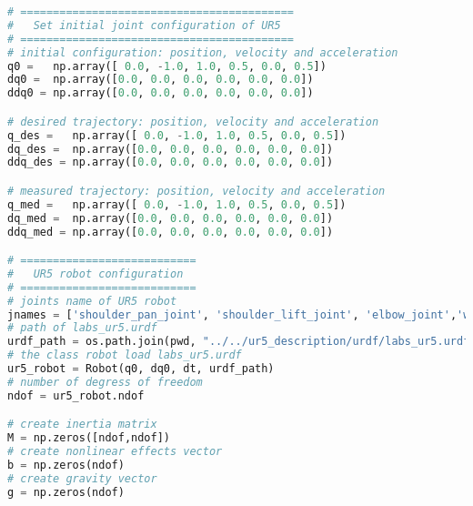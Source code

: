 \begin{lstlisting}[language=Python, caption={Move the ur5 robot end-effector using pose inverse dynamics \eqref{eq:pose_idyn} to achieve position $\mathbf{p_0}=\begin{bmatrix}  0.577 &   0.192 &   0.364 \end{bmatrix}$~m and Euler angles orientation $\gamma=\frac{\pi}{2}\sin{0.4\pi t}$.}, label={lst:pose_idyn}]
# ==========================================
#   Set initial joint configuration of UR5
# ==========================================
# initial configuration: position, velocity and acceleration 
q0 =   np.array([ 0.0, -1.0, 1.0, 0.5, 0.0, 0.5])
dq0 =  np.array([0.0, 0.0, 0.0, 0.0, 0.0, 0.0]) 
ddq0 = np.array([0.0, 0.0, 0.0, 0.0, 0.0, 0.0]) 

# desired trajectory: position, velocity and acceleration
q_des =   np.array([ 0.0, -1.0, 1.0, 0.5, 0.0, 0.5])
dq_des =  np.array([0.0, 0.0, 0.0, 0.0, 0.0, 0.0]) 
ddq_des = np.array([0.0, 0.0, 0.0, 0.0, 0.0, 0.0]) 

# measured trajectory: position, velocity and acceleration
q_med =   np.array([ 0.0, -1.0, 1.0, 0.5, 0.0, 0.5])
dq_med =  np.array([0.0, 0.0, 0.0, 0.0, 0.0, 0.0]) 
ddq_med = np.array([0.0, 0.0, 0.0, 0.0, 0.0, 0.0]) 

# ===========================
#   UR5 robot configuration
# ===========================
# joints name of UR5 robot
jnames = ['shoulder_pan_joint', 'shoulder_lift_joint', 'elbow_joint','wrist_1_joint', 'wrist_2_joint', 'wrist_3_joint']
# path of labs_ur5.urdf
urdf_path = os.path.join(pwd, "../../ur5_description/urdf/labs_ur5.urdf")
# the class robot load labs_ur5.urdf
ur5_robot = Robot(q0, dq0, dt, urdf_path)
# number of degress of freedom
ndof = ur5_robot.ndof

# create inertia matrix 
M = np.zeros([ndof,ndof])
# create nonlinear effects vector
b = np.zeros(ndof)
# create gravity vector
g = np.zeros(ndof)


\end{lstlisting}

